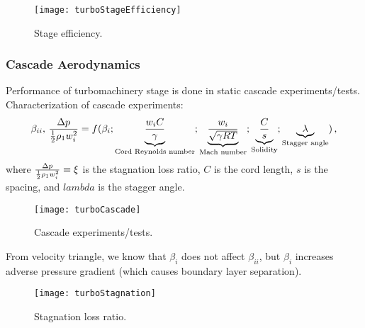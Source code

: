 \begin{figure}[!htb!]
 \centering
    {\texttt{[image: turboStageEfficiency]}}
    \caption{\label{FIG_TURBO_STAGE_EFFICIENCY}Stage efficiency.}
\end{figure}

\subsubsection{Cascade Aerodynamics}
Performance of turbomachinery stage is done in static cascade experiments/tests. Characterization of cascade experiments:
\begin{equation}
  \beta_{ii},\, {\frac{\Delta p}{{\frac{1}{2}} \rho_1 w_i^2}} = f( \beta_i; \underbrace{{\frac{w_i C}{\gamma}}}_\text{Cord Reynolds number}; \underbrace{{\frac{w_i}{\sqrt{\gamma R T}}}}_\text{Mach number}; \underbrace{{\frac{C}{s}}}_\text{Solidity}; \underbrace{\lambda}_\text{Stagger angle} )\,,
\end{equation}
where ${\frac{\Delta p}{{\frac{1}{2}} \rho_1 w_i^2}} \equiv \xi$ is the stagnation loss ratio, $C$ is the cord length, $s$ is the spacing, and $lambda$ is the stagger angle.

\begin{figure}[!htb!]
 \centering
    {\texttt{[image: turboCascade]}}
    \caption{\label{FIG_TURBO_CASCADE}Cascade experiments/tests.}
\end{figure}

From velocity triangle, we know that $\beta_i$ does not affect $\beta_{ii}$, but $\beta_i$ increases adverse pressure gradient (which causes boundary layer separation).

\begin{figure}[!htb!]
 \centering
    {\texttt{[image: turboStagnation]}}
    \caption{\label{FIG_TURBO_STAGNATION}Stagnation loss ratio.}
\end{figure}

